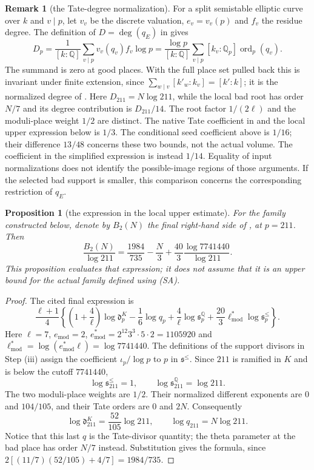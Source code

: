 \documentclass[11pt]{article}
\theoremstyle{plain}
\newtheorem{proposition}[theorem]{Proposition}
\theoremstyle{definition}
\newtheorem{remark}[theorem]{Remark}
\newcommand{\SA}{\textup{(SA)}}
\newcommand{\ord}{\operatorname{ord}}
\begin{document}
\begin{remark}[the Tate-degree normalization]
For a split semistable elliptic curve over $k$ and $v\mid p$, let $v_v$ be the
discrete valuation, $e_v=v_v(p)$ and $f_v$ the residue degree.
The definition of $D=\deg(q_E)$ in \cite[\S1.2]{SS} gives
\[
 D_p=\frac1{[k:\mathbb Q]}\sum_{v\mid p}v_v(q_v)f_v\log p
 =\frac{\log p}{[k:\mathbb Q]}
   \sum_{v\mid p}[k_v:\mathbb Q_p]\ord_p(q_v).
\]
The summand is zero at good places.
With the full place set pulled back this is invariant under finite extension,
since $\sum_{w\mid v}[k'_w:k_v]=[k':k]$; it is the normalized degree of
\cite[Definition 1.9]{IUT4}.  Here $D_{211}=N\log211$, while the local bad
root has order $N/7$ and its degree contribution is $D_{211}/14$.
The root factor $1/(2\ell)$ and the moduli-place weight $1/2$ are distinct.
The native Tate coefficient in \cite[equation (1.5)]{SS} and the local upper
expression below is $1/3$.  The conditional seed coefficient above is $1/16$;
their difference $13/48$ concerns these two bounds, not the actual volume.
The coefficient in the simplified expression \cite[equation (1.6)]{SS} is
instead $1/14$.  Equality of input normalizations does not identify the
possible-image regions of those arguments.  If the selected bad support is
smaller, this comparison concerns the corresponding restriction of $q_E$.
\end{remark}

\begin{proposition}[the expression in the local upper estimate]\label{prop:B2}
For the family constructed below, denote by $B_2(N)$ the final right-hand
side of \cite[Theorem 1.10, proof, Step (v)]{IUT4}, at $p=211$.
Then
\[
 \frac{B_2(N)}{\log211}=
 \frac{1984}{735}-\frac N3+
 \frac{40}{3}\frac{\log7741440}{\log211}.
\]
This proposition evaluates that expression; it does not assume that it is an
upper bound for the actual family defined using \SA{}.
\end{proposition}
\begin{proof}
The cited final expression is
\[
 \frac{\ell+1}{4}\left\{
 \left(1+\frac4\ell\right)\log\mathfrak d^K_p
 -\frac16\log q_p+\frac4\ell\log\mathfrak s^{\mathbb Q}_p
 +\frac{20}{3}\ell^*_{\mathrm{mod}}\log\mathfrak s^{\le}_p\right\}.
\]
Here $\ell=7$, $e_{\mathrm{mod}}=2$,
$e^*_{\mathrm{mod}}=2^{12}3^3\cdot5\cdot2=1105920$ and
$\ell^*_{\mathrm{mod}}=\log(e^*_{\mathrm{mod}}\ell)=\log7741440$.
The definitions of the support divisors in Step (iii) assign the coefficient
$\iota_p/\log p$ to $p$ in $\mathfrak s^{\le}$.
Since $211$ is ramified in $K$ and is below the cutoff $7741440$,
\[
 \log\mathfrak s^{\le}_{211}=1,\qquad
 \log\mathfrak s^{\mathbb Q}_{211}=\log211.
\]
The two moduli-place weights are $1/2$.  Their normalized different
exponents are $0$ and $104/105$, and their Tate orders are $0$ and $2N$.
Consequently
\[
 \log\mathfrak d^K_{211}=\frac{52}{105}\log211,\qquad
 \log q_{211}=N\log211.
\]
Notice that this last $q$ is the Tate-divisor quantity; the theta parameter
at the bad place has order $N/7$ instead.
Substitution gives the formula, since
$2[(11/7)(52/105)+4/7]=1984/735$.
\end{proof}
\end{document}
